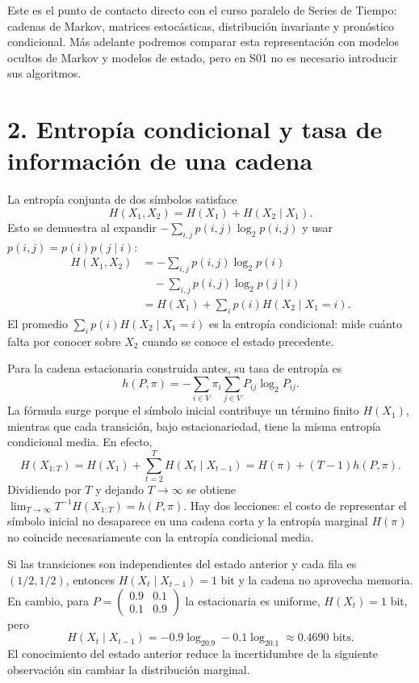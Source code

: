 \begin{puente}
Este es el punto de contacto directo con el curso paralelo de Series
de Tiempo: cadenas de Markov, matrices estocásticas, distribución invariante
y pronóstico condicional. Más adelante podremos comparar esta representación
con modelos ocultos de Markov y modelos de estado, pero en S01 no es
necesario introducir sus algoritmos.
\end{puente}

\section*{2. Entropía condicional y tasa de información de una cadena}
La entropía conjunta de dos símbolos satisface
\[
H(X_1,X_2)=H(X_1)+H(X_2\mid X_1).
\]
Esto se demuestra al expandir
$-\sum_{i,j}p(i,j)\log_2 p(i,j)$ y usar
$p(i,j)=p(i)p(j\mid i)$:
\[
\begin{split}
H(X_1,X_2)&=-\sum_{i,j}p(i,j)\log_2p(i)\\
&\quad-\sum_{i,j}p(i,j)\log_2p(j\mid i)\\
&=H(X_1)+\sum_i p(i)H(X_2\mid X_1=i).
\end{split}
\]
El promedio $\sum_i p(i)H(X_2\mid X_1=i)$ es
la entropía condicional: mide cuánto falta por conocer sobre $X_2$
cuando se conoce el estado precedente.

Para la cadena estacionaria construida antes, su tasa de entropía es
\[
h(P,\pi)=-\sum_{i\in V}\pi_i\sum_{j\in V}P_{ij}\log_2P_{ij}.
\]
La fórmula surge porque el símbolo inicial contribuye un término finito
$H(X_1)$, mientras que cada transición, bajo estacionariedad, tiene
la misma entropía condicional media. En efecto,
\[
H(X_{1:T})=H(X_1)+\sum_{t=2}^T H(X_t\mid X_{t-1})
=H(\pi)+(T-1)h(P,\pi).
\]
Dividiendo por $T$ y dejando $T\to\infty$ se obtiene
$\lim_{T\to\infty}T^{-1}H(X_{1:T})=h(P,\pi)$.
Hay dos lecciones: el costo de representar el símbolo inicial
no desaparece en una cadena corta y la entropía marginal $H(\pi)$
no coincide necesariamente con la entropía condicional media.

\begin{ejemplo}
Si las transiciones son independientes del estado anterior y cada fila
es $(1/2,1/2)$, entonces $H(X_t\mid X_{t-1})=1$ bit y la cadena
no aprovecha memoria. En cambio, para
$P=\left(\begin{smallmatrix}0.9&0.1\\0.1&0.9\end{smallmatrix}\right)$
la estacionaria es uniforme, $H(X_t)=1$ bit, pero
\[
H(X_t\mid X_{t-1})=-0.9\log_20.9-0.1\log_20.1\approx0.4690
\text{ bits}.
\]
El conocimiento del estado anterior reduce la incertidumbre de
la siguiente observación sin cambiar la distribución marginal.
\end{ejemplo}

